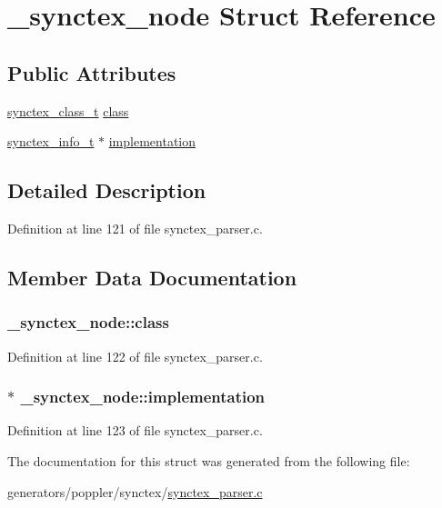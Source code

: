 \hypertarget{struct__synctex__node}{\section{\+\_\+synctex\+\_\+node Struct Reference}
\label{struct__synctex__node}
}
\subsection*{Public Attributes}
\begin{DoxyCompactItemize}
\item 
\hyperlink{synctex__parser_8c_a68d11a2cb22716e7abd35cffed7d54c5}{synctex\+\_\+class\+\_\+t} \hyperlink{struct__synctex__node_aaec7a3e6468120aa3648a22776026754}{class}
\item 
\hyperlink{synctex__parser_8c_a864f981cdab43a24765efb685074cf70}{synctex\+\_\+info\+\_\+t} $\ast$ \hyperlink{struct__synctex__node_a90104714ec188d99a3e914363b67e7f1}{implementation}
\end{DoxyCompactItemize}


\subsection{Detailed Description}


Definition at line 121 of file synctex\+\_\+parser.\+c.



\subsection{Member Data Documentation}
\hypertarget{struct__synctex__node_aaec7a3e6468120aa3648a22776026754}{
\subsubsection[{class}]{ \+\_\+synctex\+\_\+node\+::class}}\label{struct__synctex__node_aaec7a3e6468120aa3648a22776026754}


Definition at line 122 of file synctex\+\_\+parser.\+c.

\hypertarget{struct__synctex__node_a90104714ec188d99a3e914363b67e7f1}{
\subsubsection[{implementation}]{$\ast$ \+\_\+synctex\+\_\+node\+::implementation}}\label{struct__synctex__node_a90104714ec188d99a3e914363b67e7f1}


Definition at line 123 of file synctex\+\_\+parser.\+c.



The documentation for this struct was generated from the following file\+:\begin{DoxyCompactItemize}
\item 
generators/poppler/synctex/\hyperlink{synctex__parser_8c}{synctex\+\_\+parser.\+c}\end{DoxyCompactItemize}
